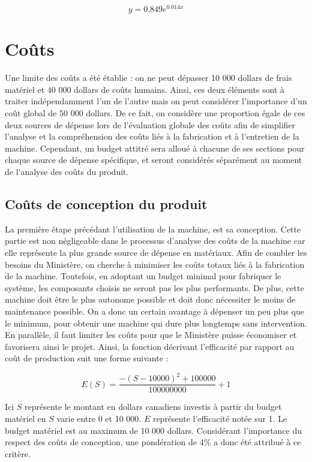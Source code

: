 \begin{equation}
    y = 0.849 e^{0.014x}
    \label{eq:bareme_sécurité}
\end{equation}

\section{Coûts}
Une limite des coûts a été établie : on ne peut dépasser 10 000 dollars de frais matériel et 40 000 dollars de coûts humains. Ainsi, ces deux éléments sont à traiter indépendamment l’un de l’autre mais on peut considérer l’importance d’un coût global de 50 000 dollars. De ce fait, on considère une proportion égale de ces deux sources de dépense lors de l’évaluation globale des coûts afin de simplifier l’analyse et la compréhension des coûts liés à la fabrication et à l’entretien de la machine. Cependant, un budget attitré sera alloué à chacune de ses sections pour chaque source de dépense spécifique, et seront considérés séparément au moment de l’analyse des coûts du produit.

\subsection{Coûts de conception du produit}
La première étape précédant l’utilisation de la machine, est sa conception. Cette partie est non négligeable dans le processus d’analyse des coûts de la machine car elle représente la plus grande source de dépense en matériaux. Afin de combler les besoins du Ministère, on cherche à minimiser les coûts totaux liés à la fabrication de la machine. Toutefois, en adoptant un budget minimal pour fabriquer le système, les composants choisis ne seront pas les plus performants. De plus, cette machine doit être le plus autonome possible et doit donc nécessiter le moins de maintenance possible. On a donc un certain avantage à dépenser un peu plus que le minimum, pour obtenir une machine qui dure plus longtemps sans intervention. En parallèle, il faut limiter les coûts pour que le Ministère puisse économiser et favorisera ainsi le projet.
Ainsi, la fonction décrivant l’efficacité par rapport au coût de production suit une forme suivante :

\begin{equation}
    E(S) = \frac{-(S-10000)^2+100000}{100000000} + 1
    \label{eq:bareme_cout_conception}
\end{equation}

Ici $S$ représente le montant en dollars canadiens investis à partir du budget matériel en $S$ varie entre 0 et 10 000. $E$ représente l’efficacité notée sur 1. Le budget matériel est au maximum de 10 000 dollars. Considérant l'importance du respect des coûts de conception, une pondération de 4\% a donc été attribué à ce critère.


